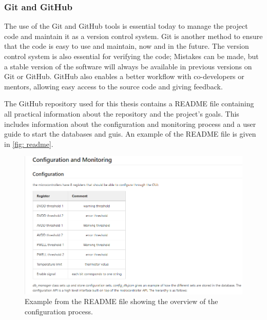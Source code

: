 \documentclass[main.tex]{subfiles}
\begin{document}
\subsubsection{Git and GitHub}
The use of the Git and GitHub tools is essential today to manage the project code and maintain it as a version control system. Git is another method to ensure that the code is easy to use and maintain, now and in the future. The version control system is also essential for verifying the code; Mistakes can be made, but a stable version of the software will always be available in previous versions on Git or GitHub. GitHub also enables a better workflow with co-developers or mentors, allowing easy access to the source code and giving feedback. 

The GitHub repository used for this thesis contains a README file containing all practical information about the repository and the project's goals. This includes information about the configuration and monitoring process and a user guide to start the databases and \gls{gui}s. An example of the README file is given in \autoref{fig: readme}.


\begin{figure}[!ht]
    \centering
    \includegraphics[width=14cm]{images/README_example.png}
    \caption{Example from the README file showing the overview of the configuration process.}
    \label{fig: readme}
\end{figure}
\FloatBarrier
\end{document}
